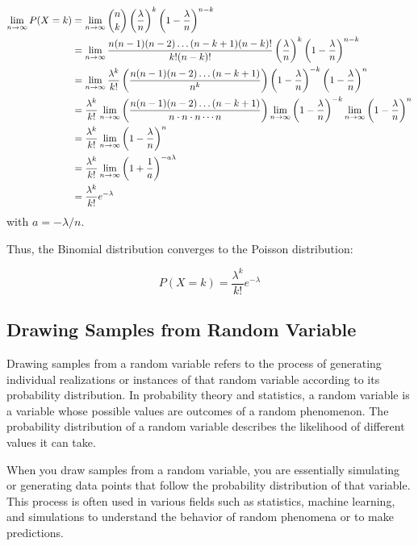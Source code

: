 \documentclass{tufte-handout}
\begin{document}
\begin{align*}
\small
\lim_{n\rightarrow \infty}P(X = k) &=  \lim_{n\rightarrow \infty}\binom{n}{k} \left( \frac{\lambda}{n} \right)^k \left( 1 - \frac{\lambda}{n} \right)^{n - k}\\
	     &= \lim_{n\rightarrow \infty} \frac{n (n-1)(n-2)\dots(n-k+1) (n-k)!}{k!(n-k)!}\left( \frac{\lambda}{n} \right)^k \left( 1 - \frac{\lambda}{n} \right)^{n - k}\\
	     &=\lim_{n\rightarrow \infty}  \frac{\lambda^k}{k!}  \left( \frac{n (n-1)(n-2)\dots(n-k+1)}{n^k} \right)\left( 1 - \frac{\lambda}{n} \right)^{-k}\left( 1 - \frac{\lambda}{n} \right)^{n}\\
	     &= \frac{\lambda^k}{k!}  \lim_{n\rightarrow \infty}  \left( \frac{n (n-1)(n-2)\dots(n-k+1)}{n \cdot n \cdot n \cdots  n } \right) \lim_{n\rightarrow \infty} \left( 1 - \frac{\lambda}{n} \right)^{-k} 
	     \lim_{n\rightarrow \infty} \left( 1 -\frac{\lambda}{n} \right)^{n}\\
	     &= \frac{\lambda^k}{k!}  \lim_{n\rightarrow \infty} \left( 1 -\frac{\lambda}{n} \right)^{n}\\	
	     &= \frac{\lambda^k}{k!}  \lim_{n\rightarrow \infty} \left( 1 + \frac{1}{a} \right)^{-a\lambda }\\
	     &= \frac{\lambda^k}{k!} e^{-\lambda}\\	     	     
\end{align*}
with $a=-\lambda/n$. 

Thus, the Binomial distribution converges to the Poisson distribution:


\[
\boxed{P(X = k) = \frac{\lambda^k}{k!} e^{-\lambda}}
\]
\subsection{Drawing Samples from  Random Variable}

Drawing samples from a random variable refers to the process of generating individual realizations or instances of that random variable according to its probability distribution. In probability theory and statistics, a random variable is a variable whose possible values are outcomes of a random phenomenon. The probability distribution of a random variable describes the likelihood of different values it can take.

When you draw samples from a random variable, you are essentially simulating or generating data points that follow the probability distribution of that variable. This process is often used in various fields such as statistics, machine learning, and simulations to understand the behavior of random phenomena or to make predictions.
\end{document}
